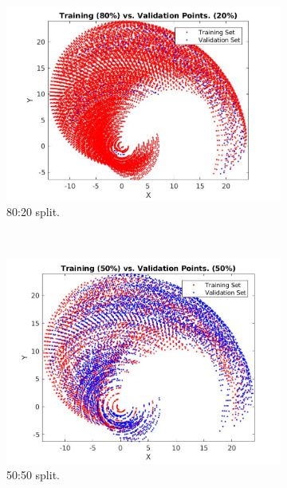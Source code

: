 \documentclass[a4paper, oneside, 12pt]{article}
\begin{document}
\begin{figure}[H]  %
	\centering
	\begin{subfigure}{0.48\textwidth}
		\includegraphics[width=1\textwidth]{trnvsval80.jpg}
		\caption{80:20 split.}
		\label{fig::1a}
	\end{subfigure}
	~
	\begin{subfigure}{0.48\textwidth}
		\includegraphics[width=1\textwidth]{trnvsval50.jpg}
		\caption{50:50 split.}
		\label{fig::1b}
	\end{subfigure}	
	\begin{subfigure}{0.48\textwidth}

\end{subfigure}
\end{figure}
\end{document}
